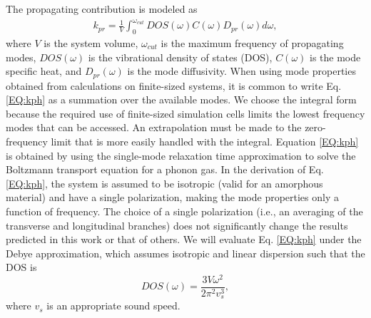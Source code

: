 \documentclass[aps,prb,onecolumn,preprint,superscriptaddress,footinbib,amsmath,amssymb,floatfix]{revtex4}
\begin{document}
The propagating contribution is modeled as
\cite{feldman_thermal_1993,feldman_numerical_1999} 
\begin{equation}\label{EQ:kph}
\begin{split}
k_{pr} = \frac{1}{V}\int_{0}^{\omega_{cut}} 
DOS(\omega) C(\omega) D_{pr}(\omega)d\omega,
\end{split}
\end{equation}
where $V$ is the system volume, $\omega_{cut}$ is the maximum 
frequency of propagating modes,  
$DOS(\omega)$ is the vibrational 
density of states (DOS), $C(\omega)$ is the mode specific heat, 
and $D_{pr}(\omega)$ is the mode diffusivity. When using mode 
properties obtained from calculations on finite-sized systems, 
it is common 
to write Eq. \eqref{EQ:kph} as a summation over the available modes.
\cite{feldman_thermal_1993,feldman_numerical_1999}
We choose the integral form because the required use of finite-sized 
simulation cells limits the lowest frequency 
modes that can be accessed. An extrapolation 
must be made to the zero-frequency limit that is more easily 
handled with the integral.
\cite{love_estimate_1990,feldman_thermal_1993,cahill_thermal_1994,
feldman_numerical_1999,baldi_thermal_2008,
liu_high_2009,yang_anomalously_2010}    
Equation \eqref{EQ:kph} is obtained by using the single-mode relaxation
time approximation to solve 
the Boltzmann transport equation for a phonon gas.
\cite{ziman_electrons_2001} In the derivation of Eq. 
\eqref{EQ:kph}, the system is assumed to be isotropic 
(valid for an amorphous material) 
and have a single polarization, 
making the mode properties only a function of frequency. The 
choice of a single polarization (i.e., an averaging 
of the transverse and longitudinal branches) 
does not significantly change the results predicted in this work  
or that of others.
\cite{feldman_thermal_1993,cahill_thermal_1994,
feldman_numerical_1999,baldi_thermal_2008,liu_high_2009,
yang_anomalously_2010} 
We will evaluate Eq. \eqref{EQ:kph} under the Debye approximation, 
which assumes isotropic and linear dispersion such that the DOS is
\begin{equation}\label{EQ:DOS_debye}
DOS(\omega) = \frac{3V\omega^2}{2\pi^2v_{s}^3},
\end{equation}
where $v_s$ is an appropriate sound speed.\cite{ashcroft_solid_1976} 
\end{document}
